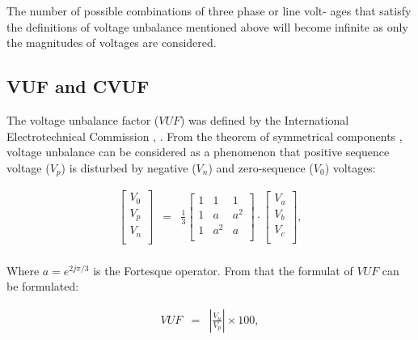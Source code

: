 The number of possible combinations of three phase or line volt- ages that satisfy the definitions of voltage unbalance mentioned above will become infinite as only the magnitudes of voltages are considered.	
		
	
	\subsection{VUF and CVUF}
	
	The voltage unbalance factor ($VUF$) was defined by the International Electrotechnical Commission \cite{pillay2001definitions}, \cite{dugan1996electrical}. From the theorem of symmetrical components \cite{fortescue1918method}, voltage unbalance can be considered as a phenomenon that positive sequence voltage  ($V_p$) is disturbed by negative  ($V_n$) and zero-sequence ($V_0$) voltages:
	
	\begin{equation}
        \begin{array}{rcl}
            \begin{bmatrix}
						V_0\\
						V_p\\
						V_n\\
						\end{bmatrix}&=&
						\frac{1}{3}\begin{bmatrix}
						1&1&1\\
						1&a&a^2\\
						1&a^2&a\\
						\end{bmatrix}\cdot
						\begin{bmatrix}
						V_a\\
						V_b\\
						V_c\\
						\end{bmatrix},\\
        \end{array}
        \label{BASICUNB:equ:symmetry}
    \end{equation}
	
	Where $a=e^{2j\pi/3}$ is the Fortesque operator. From that the formulat of $VUF$ can be formulated:
	
	
	\begin{equation}
        \begin{array}{rcl}
            VUF&=&\left|\frac{V_n}{V_p}\right|\times100,\\					
        \end{array}
        \label{BASICUNB:equ:VUF}
    \end{equation}
	
